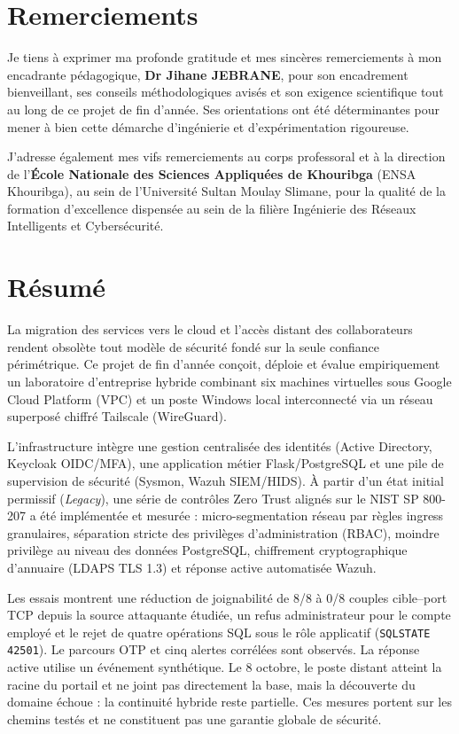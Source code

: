 \documentclass[a4paper,12pt]{report}
\begin{document}
\chapter*{Remerciements}
Je tiens à exprimer ma profonde gratitude et mes sincères remerciements à mon encadrante pédagogique, \textbf{Dr Jihane JEBRANE}, pour son encadrement bienveillant, ses conseils méthodologiques avisés et son exigence scientifique tout au long de ce projet de fin d'année. Ses orientations ont été déterminantes pour mener à bien cette démarche d'ingénierie et d'expérimentation rigoureuse.

J'adresse également mes vifs remerciements au corps professoral et à la direction de l'\textbf{École Nationale des Sciences Appliquées de Khouribga} (ENSA Khouribga), au sein de l'Université Sultan Moulay Slimane, pour la qualité de la formation d'excellence dispensée au sein de la filière Ingénierie des Réseaux Intelligents et Cybersécurité.

\chapter*{Résumé}
La migration des services vers le cloud et l'accès distant des collaborateurs rendent obsolète tout modèle de sécurité fondé sur la seule confiance périmétrique. Ce projet de fin d'année conçoit, déploie et évalue empiriquement un laboratoire d'entreprise hybride combinant six machines virtuelles sous Google Cloud Platform (VPC) et un poste Windows local interconnecté via un réseau superposé chiffré Tailscale (WireGuard).

L'infrastructure intègre une gestion centralisée des identités (Active Directory, Keycloak OIDC/MFA), une application métier Flask/PostgreSQL et une pile de supervision de sécurité (Sysmon, Wazuh SIEM/HIDS). À partir d'un état initial permissif (\textit{Legacy}), une série de contrôles Zero Trust alignés sur le NIST SP 800-207 a été implémentée et mesurée : micro-segmentation réseau par règles ingress granulaires, séparation stricte des privilèges d'administration (RBAC), moindre privilège au niveau des données PostgreSQL, chiffrement cryptographique d'annuaire (LDAPS TLS 1.3) et réponse active automatisée Wazuh.

Les essais montrent une réduction de joignabilité de 8/8 à 0/8 couples cible--port TCP depuis la source attaquante étudiée, un refus administrateur pour le compte employé et le rejet de quatre opérations SQL sous le rôle applicatif (\texttt{SQLSTATE 42501}). Le parcours OTP et cinq alertes corrélées sont observés. La réponse active utilise un événement synthétique. Le 8 octobre, le poste distant atteint la racine du portail et ne joint pas directement la base, mais la découverte du domaine échoue : la continuité hybride reste partielle. Ces mesures portent sur les chemins testés et ne constituent pas une garantie globale de sécurité.
\end{document}
